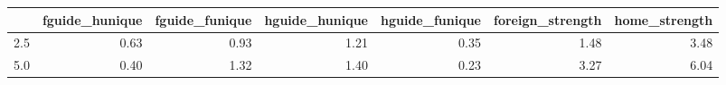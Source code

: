 \begin{tabular}{lrrrrrr}
\toprule
 & fguide_hunique & fguide_funique & hguide_hunique & hguide_funique & foreign_strength & home_strength \\
\midrule
2.5 & 0.63 & 0.93 & 1.21 & 0.35 & 1.48 & 3.48 \\
5.0 & 0.40 & 1.32 & 1.40 & 0.23 & 3.27 & 6.04 \\
\bottomrule
\end{tabular}
